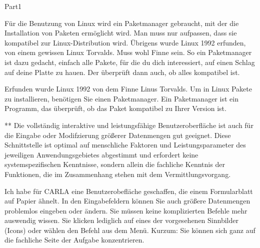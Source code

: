 \documentclass[a4paper,twoside]{article}
\begin{document}
\begin{exam}[Teil I.]{Part1}
\begin{problem}[10]
Für die Benutzung von Linux wird ein Paketmanager gebraucht, mit der die
Installation von Paketen ermöglicht wird. Man muss nur aufpassen, dass sie
kompatibel zur Linux-Distribution wird. Übrigens wurde Linux 1992 erfunden,
von einem gewissen Linux Torvalds. Muss wohl Finne sein. So ein Paketmanager
ist dazu gedacht, einfach alle Pakete, für die du dich interessiert, auf
einen Schlag auf deine Platte zu hauen. Der überprüft dann auch, ob
alles kompatibel ist.
\begin{solution}
Erfunden wurde Linux 1992 von dem Finne Linus Torvalds. Um in Linux Pakete
zu installieren, benötigen Sie einen Paketmanager. Ein Paketmanager ist ein 
Programm, das überprüft, ob das Paket kompatibel zu Ihrer Version ist.
\end{solution}
\end{problem}


\begin{problem}[10]
** Die vollständig interaktive und leistungsfähige Benutzeroberfläche ist auch
für die Eingabe oder Modifzierung größerer Datenmengen gut geeignet. Diese
Schnittstelle ist optimal auf menschliche Faktoren und Leistungsparameter des
jeweiligen Anwendungsgebietes abgestimmt und erfordert keine systemspezifischen
Kenntnisse, sondern allein die fachliche Kenntnis der Funktionen, die im
Zusammenhang stehen mit dem Vermittlungsvorgang.
\begin{solution}
Ich habe für CARLA eine Benutzerobefläche geschaffen, die einem Formularblatt
auf Papier ähnelt. In den Eingabefeldern können Sie auch größere Datenmengen
problemlos eingeben oder ändern. Sie müssen keine komplizierten Befehle mehr
auswendig wissen. Sie klicken lediglich auf eines der vorgesehenen Sinnbilder
(Icons) oder wählen den Befehl aus dem Menü. Kurzum: Sie können sich ganz auf
die fachliche Seite der Aufgabe konzentrieren.
\end{solution}
\end{problem}


\end{exam}
\end{document}
